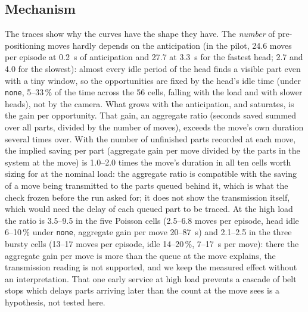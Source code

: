 \documentclass[11pt,a4paper]{article}
\begin{document}
\subsection{Mechanism}\label{sec:mechanism}
The traces show why the curves have the shape they have. The \emph{number} of
pre-positioning moves hardly depends on the anticipation (in the pilot, 24.6 moves per
episode at 0.2~s of anticipation and 27.7 at 3.3~s for the fastest head; 2.7 and 4.0 for
the slowest): almost every idle period of the head finds a visible part even with a tiny
window, so the opportunities are fixed by the head's idle time (under \texttt{none}, 5--33\,\% of
the time across the 56 cells, falling with the load and with slower heads), not by the
camera. What grows with
the anticipation, and saturates, is the gain per opportunity. That gain, an aggregate
ratio (seconds saved summed over all parts, divided by the number of moves), exceeds the
move's own duration several times over. With the number of unfinished parts recorded at
each move, the implied saving per part (aggregate gain per move divided by the parts in
the system at the move) is 1.0--2.0 times the move's duration in all ten cells worth sizing
for at the nominal load: the aggregate ratio is compatible with the saving of a move being
transmitted to the parts queued behind it, which is what the check frozen before the run asked
for; it does not show the transmission itself, which would need the delay of each queued
part to be traced. At the high load the ratio is 3.5--9.5 in the five Poisson cells (2.5--6.8 moves per
episode, head idle 6--10\,\% under \texttt{none}, aggregate gain per move 20--87~s) and
2.1--2.5 in the three bursty cells (13--17 moves per episode, idle 14--20\,\%, 7--17~s per
move): there the aggregate gain per move is more than the queue at the move explains, the transmission reading is not supported, and we keep the measured
effect without an interpretation. That one early service at high load prevents a cascade
of belt stops which delays parts arriving later than the count at the move sees is a
hypothesis, not tested here.
\end{document}
